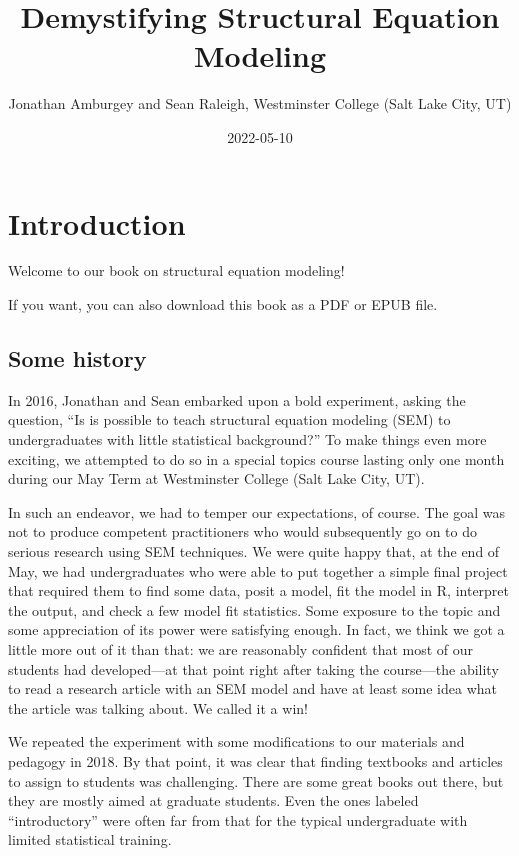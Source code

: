 \documentclass[
]{book}
\title{Demystifying Structural Equation Modeling}
\author{Jonathan Amburgey and Sean Raleigh, Westminster College (Salt Lake City, UT)}
\date{2022-05-10}
\begin{document}
\maketitle

{
\setcounter{tocdepth}{1}
\tableofcontents
}
\hypertarget{intro}{%
\chapter*{Introduction}\label{intro}}

Welcome to our book on structural equation modeling!

If you want, you can also download this book as a PDF or EPUB file.

\hypertarget{intro-history}{%
\section*{Some history}\label{intro-history}}

In 2016, Jonathan and Sean embarked upon a bold experiment, asking the question, ``Is is possible to teach structural equation modeling (SEM) to undergraduates with little statistical background?'' To make things even more exciting, we attempted to do so in a special topics course lasting only one month during our May Term at Westminster College (Salt Lake City, UT).

In such an endeavor, we had to temper our expectations, of course. The goal was not to produce competent practitioners who would subsequently go on to do serious research using SEM techniques. We were quite happy that, at the end of May, we had undergraduates who were able to put together a simple final project that required them to find some data, posit a model, fit the model in R, interpret the output, and check a few model fit statistics. Some exposure to the topic and some appreciation of its power were satisfying enough. In fact, we think we got a little more out of it than that: we are reasonably confident that most of our students had developed---at that point right after taking the course---the ability to read a research article with an SEM model and have at least some idea what the article was talking about. We called it a win!

We repeated the experiment with some modifications to our materials and pedagogy in 2018. By that point, it was clear that finding textbooks and articles to assign to students was challenging. There are some great books out there, but they are mostly aimed at graduate students. Even the ones labeled ``introductory'' were often far from that for the typical undergraduate with limited statistical training.
\end{document}
